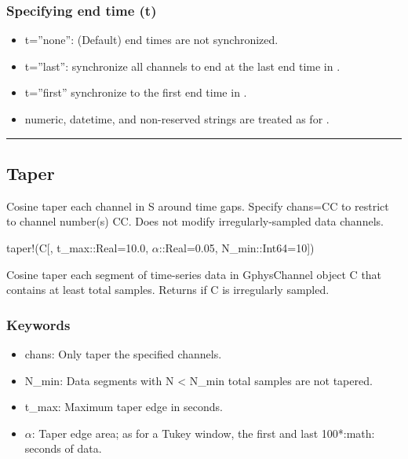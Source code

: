 \documentclass[letterpaper,11pt,english]{sphinxmanual}
\begin{document}
\subsubsection{Specifying end time (t)}
\label{\detokenize{src/Processing/processing:specifying-end-time-t}}\begin{itemize}
\item {} 
t=”none”: (Default) end times are not synchronized.

\item {} 
t=”last”: synchronize all channels to end at the last end time in .

\item {} 
t=”first” synchronize to the first end time in .

\item {} 
numeric, datetime, and non-reserved strings are treated as for .

\end{itemize}


\bigskip\hrule\bigskip



\subsection{Taper}
\label{\detokenize{src/Processing/processing:taper}}

\begin{fulllineitems}
\end{fulllineitems}


Cosine taper each channel in S around time gaps. Specify chans=CC to restrict
to channel number(s) CC. Does not modify irregularly-sampled data channels.

taper!(C{[}, t\_max::Real=10.0, \(\alpha\)::Real=0.05, N\_min::Int64=10{]})

Cosine taper each segment of time-series data in GphysChannel object C that
contains at least  total samples. Returns if C is irregularly sampled.


\subsubsection{Keywords}
\label{\detokenize{src/Processing/processing:id4}}\begin{itemize}
\item {} 
chans: Only taper the specified channels.

\item {} 
N\_min: Data segments with N \textless{} N\_min total samples are not tapered.

\item {} 
t\_max: Maximum taper edge in seconds.

\item {} 
\(\alpha\): Taper edge area; as for a Tukey window, the first and last 100*:math: seconds of data.

\end{itemize}
\end{document}
